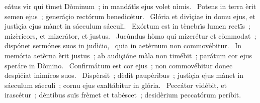 { }
{%
eátus vìr qui tìmet Dòminum~; in mandátïs ejus volet nìmis. 
~Potens in terra èrit semen ejus~; ġeneráçio rectórum benedicétur. 
~Glória et divìçiae in domu ejus, et justìçia ejus mànet in sáeculum sáeculi. 
~Exórtum est in tènebrïs lumen rectïs~; mizèricors, et mizerátor, et justus. 
~Jucùndus hòmo qui mizerétur et còmmodat~; dispónet sermónes suos in judìċio, 
~quia in aetèrnum non commovébitur. 
~In memória aetèrna èrit justus~; ab audiçióne màla non timébit~; parátum cor ejus speráre in Dòmino. 
~Confirmátum est cor ejus~; non commovébitur donec despìċiat inimícos suos. 
~Dispèrsit~; dèdit paupèribus~; justìçia ejus mànet in sáeculum sáeculi~; cornu ejus exaltábitur in glória. 
~Peccátor vidébit, et irascétur~; dèntibus suïs frèmet et tabéscet~; desidèrium peccatórum períbit. 
}
